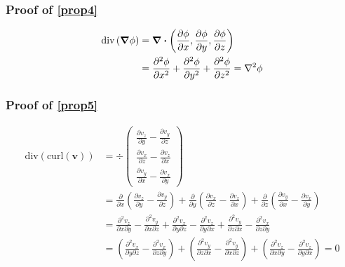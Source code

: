 \documentclass{article}
\renewcommand{\vec}[1]{\boldsymbol{#1}}
\begin{document}
\subsubsection{Proof of \eqref{prop4}}

\begin{align*}
    \text{div} \left( \grad{\phi} \right) &= \div \left( \frac{\partial{ \phi }}{\partial{ x }} , \frac{\partial{ \phi }}{\partial{ y }} , \frac{\partial{ \phi }}{\partial{ z }} \right) \\
    &= \frac{\partial^{2} { \phi }}{\partial{ x^{2} }} + \frac{\partial^{2} { \phi }}{\partial{ y^{2} }} + \frac{\partial^{2} { \phi }}{\partial{ z^{2} }} = \laplacian{\phi}
\end{align*}

\subsubsection{Proof of \eqref{prop5}}

\begin{align*}
    \text{div} \left( \text{curl}\left(\vec{v}\right) \right) &= \div \begin{pmatrix} \frac{\partial{ v_z }}{\partial{ y }} - \frac{\partial{ v_y }}{\partial{ z }} \\[0.3em] \frac{\partial{ v_x }}{\partial{ z }} - \frac{\partial{ v_z }}{\partial{ x }} \\[0.3em] \frac{\partial{ v_y }}{\partial{ x }} - \frac{\partial{ v_x }}{\partial{ y }} \end{pmatrix} \\
    &= \frac{\partial{  }}{\partial{ x }} \left( \frac{\partial{ v_z }}{\partial{ y }} - \frac{\partial{ v_y }}{\partial{ z }} \right) + \frac{\partial{  }}{\partial{ y }} \left( \frac{\partial{ v_x }}{\partial{ z }} - \frac{\partial{ v_z }}{\partial{ x }} \right) + \frac{\partial{  }}{\partial{ z }} \left( \frac{\partial{ v_y }}{\partial{ x }} - \frac{\partial{ v_x }}{\partial{ y }} \right) \\
    &= \frac{\partial^{2} { v_z }}{\partial{ x \partial{ y } }} - \frac{\partial^{2} { v_y }}{\partial{ x \partial{ z } }} + \frac{\partial^{2} { v_x }}{\partial{ y \partial{ z } }} - \frac{\partial^{2} { v_z }}{\partial{ y \partial{ x } }} + \frac{\partial^{2} { v_y }}{\partial{ z \partial{ x } }} - \frac{\partial^{2} { v_x }}{\partial{ z \partial{ y } }} \\
    &= \left( \frac{\partial^{2} { v_x }}{\partial{ y \partial{ z } }} - \frac{\partial^{2} { v_x }}{\partial{ z \partial{ y } }} \right) + \left( \frac{\partial^{2} { v_y }}{\partial{ z \partial{ x } }} - \frac{\partial^{2} { v_y }}{\partial{ x \partial{ z } }} \right) + \left( \frac{\partial^{2} { v_z }}{\partial{ x \partial{ y } }} - \frac{\partial^{2} { v_z }}{\partial{ y \partial{ x } }} \right) = 0
\end{align*}
\end{document}
